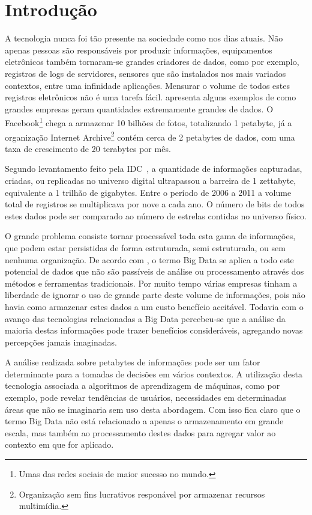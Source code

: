 \chapter{Introdução}
 
A tecnologia nunca foi tão presente na sociedade como nos dias atuais. Não apenas pessoas são responsáveis por produzir informações, equipamentos eletrônicos também tornaram-se grandes criadores de dados, como por exemplo, registros de logs de servidores, sensores que são instalados nos mais variados contextos, entre uma infinidade aplicações. Mensurar o volume de todos estes registros eletrônicos não é uma tarefa fácil.  apresenta alguns exemplos de como grandes empresas geram quantidades extremamente grandes de dados. O Facebook\footnote{Umas das redes sociais de maior sucesso no mundo.} chega a armazenar 10 bilhões de fotos, totalizando 1 petabyte, já a organização Internet Archive\footnote{Organização sem fins lucrativos responável por armazenar recursos multimídia.} contém cerca de 2 petabytes de dados, com uma taxa de crescimento de 20 terabytes por mês.

Segundo levantamento feito pela IDC~\cite{gantz2011}, a quantidade de informações capturadas, criadas, ou replicadas no universo digital ultrapassou a barreira de 1 zettabyte, equivalente a 1 trilhão de gigabytes. Entre o período de 2006 a 2011 a volume total de registros se multiplicava por nove a cada ano. O número de bits de todos estes dados pode ser comparado ao número de estrelas contidas no universo físico.

O grande problema consiste tornar processável toda esta gama de informações, que podem estar persistidas de forma estruturada, semi estruturada, ou sem nenhuma organização. De acordo com , o termo Big Data se aplica a todo este potencial de dados que não são passíveis de análise ou processamento através dos métodos e ferramentas tradicionais. Por muito tempo várias empresas tinham a liberdade de ignorar o uso de grande parte deste volume de informações, pois não havia como armazenar estes dados a um custo benefício aceitável. Todavia com o avanço das tecnologias relacionadas a Big Data percebeu-se que a análise da maioria destas informações pode trazer benefícios consideráveis, agregando novas percepções jamais imaginadas.

A análise realizada sobre petabytes de informações pode ser um fator determinante para a tomadas de decisões em vários contextos. A utilização desta tecnologia associada a algoritmos de aprendizagem de máquinas, como por exemplo, pode revelar tendências de usuários, necessidades em determinadas áreas que não se imaginaria sem uso desta abordagem. Com isso fica claro que o termo Big Data não está relacionado a apenas o armazenamento em grande escala, mas também ao processamento destes dados para agregar valor ao contexto em que for aplicado.

